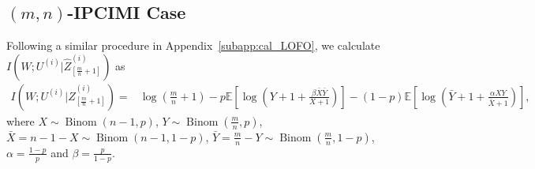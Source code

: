 \documentclass[onecolumn,romanappendices,10pt]{IEEEtran}
\newcommand{\EE}{{\mathbb{E}}}
\DeclareMathOperator{\Binomial}{Binom}
\begin{document}
	\subsection{$(m, n)$-IPCIMI Case} \label{subapp:cal_mn_IPCIMI}
	Following a similar procedure in Appendix~\ref{subapp:cal_LOFO}, we calculate $I( W; U^{(i)} | \hat{Z}_{[\frac{m}{n}+1]}^{(i)} )$ as
	\begin{equation}
		\begin{aligned}
			I\left( W; U^{(i)} | \hat{Z}_{[\frac{m}{n}+1]}^{(i)} \right) =& \log \left( \frac{m}{n} + 1 \right) - p \EE \left[ \log \left( Y + 1 + \frac{\beta \bar{X} \bar{Y}}{X + 1} \right) \right] - (1 - p) \EE \left[ \log \left( \bar{Y} + 1 + \frac{\alpha X Y}{\bar{X} + 1} \right) \right],
		\end{aligned}
	\end{equation}
	where $X \sim \Binomial\left( n - 1, p \right)$, $Y \sim \Binomial\left( \frac{m}{n}, p \right)$, $\bar{X} = n - 1 - X \sim \Binomial\left( n - 1, 1 - p \right)$, $\bar{Y} = \frac{m}{n} - Y \sim \Binomial\left( \frac{m}{n}, 1 - p \right)$, $\alpha = \frac{1 - p}{p}$ and $\beta = \frac{p}{1 - p}$.
	
\end{document}
